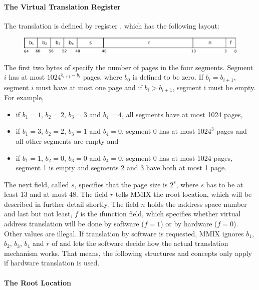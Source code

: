 \paragraph{The Virtual Translation Register}

The translation is defined by register , which has the following layout:
\begin{figure}[H]
	\centering
	\includegraphics[width=\textwidth]{img/rV-crop.pdf}
\end{figure}
\vspace{-20pt}
\noindent The first two bytes of  specify the number of pages in the four segments. Segment $i$ has at most $1024^{b_{i+1}-b_i}$ pages, where $b_0$ is defined to be zero. If $b_i = b_{i+1}$, segment $i$ must have at most one page and if $b_i > b_{i+1}$, segment i must be empty. For example,
\begin{itemize}
	\item if $b_1 = 1$, $b_2 = 2$, $b_3 = 3$ and $b_4 = 4$, all segments have at most 1024 pages,
	\item if $b_1 = 3$, $b_2 = 2$, $b_3 = 1$ and $b_4 = 0$, segment 0 has at most $1024^3$ pages and all other segments are empty and
	\item if $b_1 = 1$, $b_2 = 0$, $b_3 = 0$ and $b_4 = 0$, segment 0 has at most 1024 pages, segment 1 is empty and segments 2 and 3 have both at most 1 page.
\end{itemize}
The next field, called $s$, specifies that the page size is $2^s$, where $s$ has to be at least 13 and at most 48. The field $r$ tells MMIX the \i{root location}, which will be described in further detail shortly. The field $n$ holds the \i{address space number} and last but not least, $f$ is the \i{function field}, which specifies whether virtual address translation will be done by software ($f=1$) or by hardware ($f=0$). Other values are illegal. If translation by software is requested, MMIX ignores $b_1$, $b_2$, $b_3$, $b_4$ and $r$ of  and lets the software decide how the actual translation mechanism works. That means, the following structures and concepts only apply if hardware translation is used. \citep[pg. 36]{mmix-doc}

\paragraph{The Root Location}

